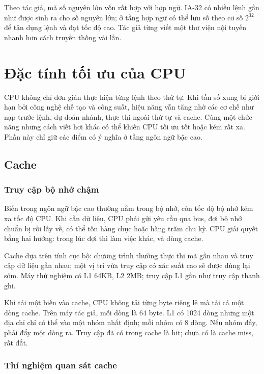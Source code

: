 \documentclass[11pt]{article}
\begin{document}
Theo tác giả, mã số nguyên lớn vốn rất hợp với hợp ngữ. IA-32 có nhiều lệnh
gần như được sinh ra cho số nguyên lớn; ở tầng hợp ngữ có thể lưu số theo cơ
số \(2^{32}\) để tận dụng lệnh và đạt tốc độ cao. Tác giả từng viết một thư
viện nội tuyến nhanh hơn cách truyền thống vài lần.

\section{Đặc tính tối ưu của CPU}

CPU không chỉ đơn giản thực hiện từng lệnh theo thứ tự. Khi tần số xung bị
giới hạn bởi công nghệ chế tạo và công suất, hiệu năng vẫn tăng nhờ các cơ
chế như nạp trước lệnh, dự đoán nhánh, thực thi ngoài thứ tự và cache. Cùng
một chức năng nhưng cách viết hơi khác có thể khiến CPU tối ưu tốt hoặc kém
rất xa. Phần này chỉ giữ các điểm có ý nghĩa ở tầng ngôn ngữ bậc cao.

\subsection{Cache}

\subsubsection{Truy cập bộ nhớ chậm}

Biến trong ngôn ngữ bậc cao thường nằm trong bộ nhớ, còn tốc độ bộ nhớ kém xa
tốc độ CPU. Khi cần dữ liệu, CPU phải gửi yêu cầu qua bus, đợi bộ nhớ chuẩn
bị rồi lấy về, có thể tốn hàng chục hoặc hàng trăm chu kỳ. CPU giải quyết
bằng hai hướng: trong lúc đợi thì làm việc khác, và dùng cache.

Cache dựa trên tính cục bộ: chương trình thường thực thi mã gần nhau và truy
cập dữ liệu gần nhau; một vị trí vừa truy cập có xác suất cao sẽ được dùng
lại sớm. Máy thử nghiệm có L1 64KB, L2 2MB; truy cập L1 gần như truy cập
thanh ghi.

Khi tải một biến vào cache, CPU không tải từng byte riêng lẻ mà tải cả một
dòng cache. Trên máy tác giả, mỗi dòng là 64 byte. L1 có 1024 dòng nhưng một
địa chỉ chỉ có thể vào một nhóm nhất định; mỗi nhóm có 8 dòng. Nếu nhóm đầy,
phải đẩy một dòng ra. Truy cập đã có trong cache là hit; chưa có là cache
miss, rất đắt.

\subsubsection{Thí nghiệm quan sát cache}
\end{document}
